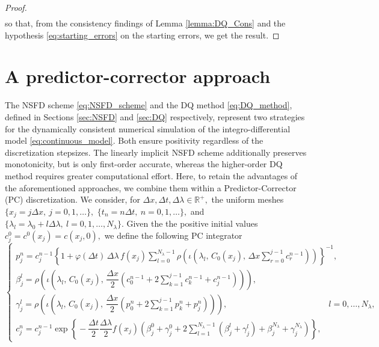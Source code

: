 \documentclass[a4paper, UKenglish, numberwithinsect, thm-restate]{tgdk-v2021}
\begin{document}
\begin{proof}
\begin{equation*}
\begin{split}
        \end{split}
    \end{equation*}
    so that, from the consistency findings of Lemma \ref{lemma:DQ_Cons} and the hypothesis \eqref{eq:starting_errors} on the starting errors, we get the result.
\end{proof}

\section{A predictor-corrector approach}\label{sec:PC}

The NSFD scheme \eqref{eq:NSFD_scheme} and the DQ method \eqref{eq:DQ_method}, defined in Sections \ref{sec:NSFD} and \ref{sec:DQ} respectively, represent two strategies for the dynamically consistent numerical simulation of the integro-differential model \eqref{eq:continuous_model}. Both ensure positivity regardless of the discretization stepsizes. The linearly implicit NSFD scheme additionally preserves monotonicity, but is only first-order accurate, whereas the higher-order DQ method requires greater computational effort. Here, to retain the advantages of the aforementioned approaches, we combine them within a Predictor-Corrector (PC) discretization. We consider, for $\Delta x, \Delta t, \Delta \lambda\in \mathbb{R}^+,$ the uniform meshes $\{x_j=j \Delta x, \ j=0,1,\dots \},$ $\{t_n=n \Delta t, \ n=0,1,\dots  \},$ and $\{\lambda_l=\lambda_{0}+l \Delta \lambda, \ l=0,1,\dots, N_\lambda \}.$ Given the the positive initial values $c_j^0=c^0(x_j)=c(x_j,0),$ we  define the following PC integrator
\begin{equation}\label{eq:PC}
    \begin{cases}
         p_j^{n}=c_j^{n-1}\left\{\displaystyle 1+ \varphi(\Delta t) \, \Delta \lambda \, f(x_j) \sum_{l=0}^{N_\lambda-1}\rho\left(\iota\left(\lambda_l,\, C_0(x_j) ,\, \Delta x \sum_{r=0}^{j-1}c_r^{n-1} \right)\right)\right\}^{-1}, \\
         \displaystyle\beta_{j}^{l}=\rho\!\left( \! \iota \! \left(\lambda_l,\, C_0(x_j) ,\, \dfrac{\Delta x}{2} \!\left(c_0^{n-1}+2\sum_{k=1}^{j-1}c_k^{n-1}+c_j^{n-1} \right) \right)\!\right),                                   \\
         \displaystyle\gamma_{j}^{l}=\rho\!\left( \! \iota \! \left(\lambda_l,\, C_0(x_j) ,\, \dfrac{\Delta x}{2} \!\left(p_0^{n}+2\sum_{k=1}^{j-1}p_k^{n}+p_j^{n} \right) \right)\!\right), \qquad \qquad \qquad \qquad \qquad \qquad l=0,\dots,N_\lambda, \\
         c^{n}_j   \displaystyle=c^{n-1}_j  \exp\left\{ \! -\dfrac{\Delta t}{2} \dfrac{\Delta \lambda}{2}  f(x_j) \! \left( \!\beta_j^{0}+\gamma_{j}^{0}+ 2\!\!\sum_{l=1}^{N_{\lambda}-1}\!\left(\beta_j^{l}+\gamma_{j}^{l}\right)+ \beta_j^{N_\lambda}+\gamma_{j}^{N_\lambda} \! \right) \!   \right\}, 
    \end{cases}
\end{equation}
\end{document}
